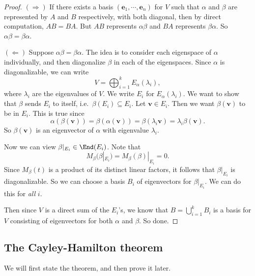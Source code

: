 \documentclass[a4paper]{article}
\begin{document}
\begin{proof}
  $(\Rightarrow)$ If there exists a basis $(\mathbf{e}_1, \cdots, \mathbf{e}_n)$ for $V$ such that $\alpha$ and $\beta$ are represented by $A$ and $B$ respectively, with both diagonal, then by direct computation, $AB = BA$. But $AB$ represents $\alpha\beta$ and $BA$ represents $\beta\alpha$. So $\alpha\beta = \beta\alpha$.

  $(\Leftarrow)$ Suppose $\alpha\beta = \beta\alpha$. The idea is to consider each eigenspace of $\alpha$ individually, and then diagonalize $\beta$ in each of the eigenspaces. Since $\alpha$ is diagonalizable, we can write
  \[
    V = \bigoplus_{i = 1}^k E_\alpha(\lambda_i),
  \]
  where $\lambda_i$ are the eigenvalues of $V$. We write $E_i$ for $E_\alpha (\lambda_i)$. We want to show that $\beta$ sends $E_i$ to itself, i.e.\ $\beta(E_i) \subseteq E_i$. Let $\mathbf{v} \in E_i$. Then we want $\beta(\mathbf{v})$ to be in $E_i$. This is true since
  \[
    \alpha(\beta(\mathbf{v})) = \beta(\alpha(\mathbf{v})) = \beta(\lambda_i \mathbf{v}) = \lambda_i \beta(\mathbf{v}).
  \]
  So $\beta(\mathbf{v})$ is an eigenvector of $\alpha$ with eigenvalue $\lambda_i$.

  Now we can view $\beta|_{E_i} \in \End(E_i)$. Note that
  \[
    M_\beta(\beta|_{E_i}) = M_\beta(\beta)|_{E_i} = 0.
  \]
  Since $M_\beta(t)$ is a product of its distinct linear factors, it follows that $\beta|_{E_i}$ is diagonalizable. So we can choose a basis $B_i$ of eigenvectors for $\beta|_{E_i}$. We can do this for \emph{all} $i$.

  Then since $V$ is a direct sum of the $E_i$'s, we know that $B = \bigcup_{i = 1}^k B_i$ is a basis for $V$ consisting of eigenvectors for both $\alpha$ and $\beta$. So done.
\end{proof}

\subsection{The Cayley-Hamilton theorem}
We will first state the theorem, and then prove it later.
\end{document}
